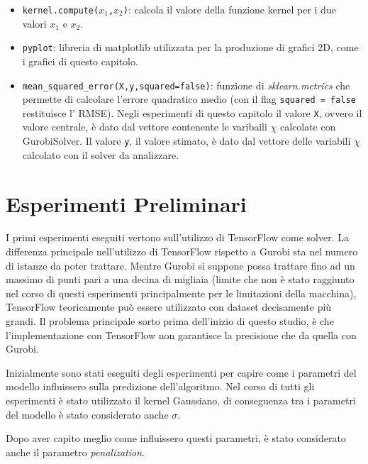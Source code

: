 \documentclass[a4paper,12pt]{report}
\begin{document}
\begin{itemize}
    \item \texttt{kernel.compute($x_{1}$,$x_{2}$)}: calcola il valore della funzione kernel per i due valori $x_{1}$ e $x_{2}$.
    \item \texttt{pyplot}: libreria di matplotlib utilizzata per la produzione di grafici 2D, come i grafici di questo capitolo.
    \item \texttt{mean\_squared\_error(X,y,squared=false)}: funzione di \textit{sklearn.metrics} che permette di calcolare l'errore quadratico medio (con il flag \texttt{squared = false} restituisce l' RMSE). Negli esperimenti di questo capitolo il valore \texttt{X}, ovvero il valore centrale, è dato dal vettore contenente le varibaili $\chi$ calcolate con GurobiSolver. Il valore \texttt{y}, il valore stimato, è dato dal vettore delle variabili $\chi$ calcolato con il solver da analizzare.
\end{itemize}

\section{Esperimenti Preliminari}
I primi esperimenti eseguiti vertono sull'utilizzo di TensorFlow come solver. La differenza principale nell'utilizzo di TensorFlow rispetto a Gurobi sta nel numero di istanze da poter trattare. Mentre Gurobi si suppone possa trattare fino ad un massimo di punti pari a una decina di migliaia (limite che non è stato raggiunto nel corso di questi esperimenti principalmente per le limitazioni della macchina), TensorFlow teoricamente può essere utilizzato con dataset decisamente più grandi. Il problema principale sorto prima dell'inizio di questo studio, è che l'implementazione con TensorFlow non garantisce la precisione che da quella con Gurobi.



Inizialmente sono stati eseguiti degli esperimenti per capire come i parametri del modello influissero sulla predizione dell'algoritmo. Nel corso di tutti gli esperimenti è stato utilizzato il kernel Gaussiano, di conseguenza tra i parametri del modello è stato considerato anche $\sigma$. 



Dopo aver capito meglio come influissero questi parametri, è stato considerato anche il parametro \textit{penalization}. 

\end{document}
